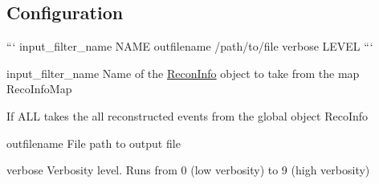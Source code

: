 \subsection*{Configuration}

``` input\-\_\-filter\-\_\-name N\-A\-M\-E outfilename /path/to/file verbose L\-E\-V\-E\-L ```


\begin{DoxyItemize}
\item {\ttfamily input\-\_\-filter\-\_\-name} Name of the {\ttfamily \hyperlink{classReconInfo}{Recon\-Info}} object to take from the map {\ttfamily Reco\-Info\-Map}
\begin{DoxyItemize}
\item If A\-L\-L takes the all reconstructed events from the global object {\ttfamily Reco\-Info}
\end{DoxyItemize}
\item {\ttfamily outfilename} File path to output file
\item {\ttfamily verbose} Verbosity level. Runs from 0 (low verbosity) to 9 (high verbosity) 
\end{DoxyItemize}